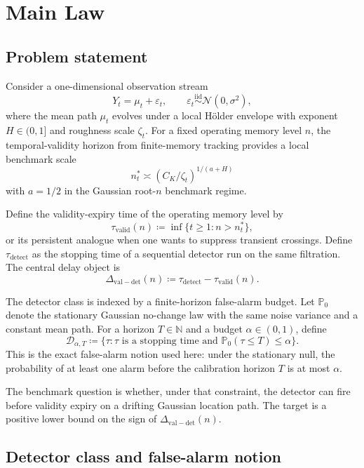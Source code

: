 \section{Main Law}

\subsection{Problem statement}

Consider a one-dimensional observation stream
\[
  Y_t = \mu_t + \varepsilon_t,
  \qquad
  \varepsilon_t \stackrel{\mathrm{iid}}{\sim} \mathcal N(0,\sigma^2),
\]
where the mean path $\mu_t$ evolves under a local H\"older envelope with
exponent $H\in(0,1]$ and roughness scale $\zeta_t$. For a fixed operating
memory level $n$, the temporal-validity horizon from finite-memory tracking
provides a local benchmark scale
\[
  n_t^* \asymp (C_K / \zeta_t)^{1/(a+H)}
\]
with $a=1/2$ in the Gaussian root-$n$ benchmark regime.

Define the validity-expiry time of the operating memory level by
\[
  \tau_{\mathrm{valid}}(n)
  \coloneqq
  \inf\{t \ge 1 : n > n_t^*\},
\]
or its persistent analogue when one wants to suppress transient crossings.
Define $\tau_{\mathrm{detect}}$ as the stopping time of a sequential detector
run on the same filtration. The central delay object is
\[
  \Delta_{\mathrm{val-det}}(n)
  \coloneqq
  \tau_{\mathrm{detect}} - \tau_{\mathrm{valid}}(n).
\]

The detector class is indexed by a finite-horizon false-alarm budget.
Let $\mathbb P_0$ denote the stationary Gaussian no-change law with the same
noise variance and a constant mean path. For a horizon $T \in \mathbb N$ and a
budget $\alpha \in (0,1)$, define
\[
  \mathcal D_{\alpha,T}
  \coloneqq
  \bigl\{\tau : \tau \text{ is a stopping time and } \mathbb P_0(\tau \le T) \le \alpha\bigr\}.
\]
This is the exact false-alarm notion used here: under the stationary null, the
probability of at least one alarm before the calibration horizon $T$ is at most
$\alpha$.

The benchmark question is whether, under that constraint, the detector can fire
before validity expiry on a drifting Gaussian location path. The target is a
positive lower bound on the sign of $\Delta_{\mathrm{val-det}}(n)$.

\subsection{Detector class and false-alarm notion}

